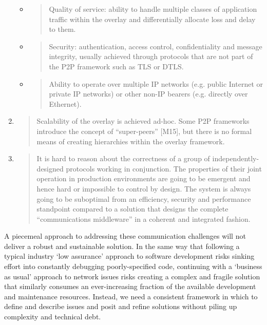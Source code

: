 \documentclass[]{article}
\begin{document}
\begin{enumerate}
  \begin{itemize}
  \item
    \begin{quote}
    Quality of service: ability to handle multiple classes of
    application traffic within the overlay and differentially allocate
    loss and delay to them.
    \end{quote}
  \item
    \begin{quote}
    Security: authentication, access control, confidentiality and
    message integrity, usually achieved through protocols that are not
    part of the P2P framework such as TLS or DTLS.
    \end{quote}
  \item
    \begin{quote}
    Ability to operate over multiple IP networks (e.g. public Internet
    or private IP networks) or other non-IP bearers (e.g. directly over
    Ethernet).
    \end{quote}
  \end{itemize}
\item
  \begin{quote}
  Scalability of the overlay is achieved ad-hoc. Some P2P frameworks
  introduce the concept of ``super-peers'' {[}M15{]}, but there is no
  formal means of creating hierarchies within the overlay framework.
  \end{quote}
\item
  \begin{quote}
  It is hard to reason about the correctness of a group of
  independently-designed protocols working in conjunction. The
  properties of their joint operation in production environments are
  going to be emergent and hence hard or impossible to control by
  design. The system is always going to be suboptimal from an
  efficiency, security and performance standpoint compared to a solution
  that designs the complete ``communications middleware'' in a coherent
  and integrated fashion.
  \end{quote}
\end{enumerate}

A piecemeal approach to addressing these communication challenges will
not deliver a robust and sustainable solution. In the same way that
following a typical industry `low assurance' approach to software
development risks sinking effort into constantly debugging
poorly-specified code, continuing with a `business as usual' approach to
network issues risks creating a complex and fragile solution that
similarly consumes an ever-increasing fraction of the available
development and maintenance resources. Instead, we need a consistent
framework in which to define and describe issues and posit and refine
solutions without piling up complexity and technical debt.
\end{document}
